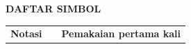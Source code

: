 \cleardoublepage
\vspace{2cm}
\begin{center}
{\fontsize{14}{16.8}\selectfont\textbf{DAFTAR SIMBOL}}\\[1em]
\end{center}
\label{chap:simbol}
\setcounter{chapter}{0}
\setcounter{section}{0}
\vspace{2em}




\begin{longtable}{@{} l >{\raggedright\arraybackslash}p{6.5cm} c @{}}
\multicolumn{1}{l}{\textbf{Notasi}} & \multicolumn{1}{l}{\textbf{Deskripsi}} & \multicolumn{1}{l}{\parbox[c]{3.5cm}{\raggedright \textbf{Pemakaian pertama kali}}} \\








\end{longtable}
